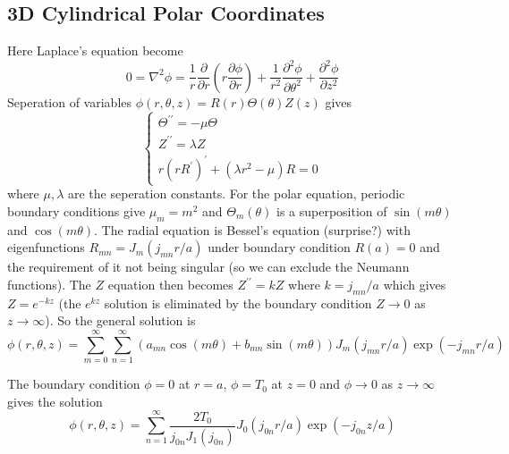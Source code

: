 \subsection{3D Cylindrical Polar Coordinates}
Here Laplace's equation become
$$0=\nabla^2\phi=\frac{1}{r}\frac{\partial}{\partial r}\left( r\frac{\partial\phi}{\partial r} \right)+\frac{1}{r^2}\frac{\partial^2\phi}{\partial\theta^2}+\frac{\partial^2\phi}{\partial z^2}$$
Seperation of variables $\phi(r,\theta,z)=R(r)\Theta(\theta)Z(z)$ gives
$$\begin{cases}
    \Theta^{\prime\prime}=-\mu\Theta\\
    Z^{\prime\prime}=\lambda Z\\
    r(rR^\prime)^\prime+(\lambda r^2-\mu)R=0
\end{cases}$$
where $\mu,\lambda$ are the seperation constants.
For the polar equation, periodic boundary conditions give $\mu_m=m^2$ and $\Theta_m(\theta)$ is a superposition of $\sin(m\theta)$ and $\cos(m\theta)$.
The radial equation is Bessel's equation (surprise?) with eigenfunctions $R_{mn}=J_m(j_{mn}r/a)$ under boundary condition $R(a)=0$ and the requirement of it not being singular (so we can exclude the Neumann functions).
The $Z$ equation then becomes $Z^{\prime\prime}=kZ$ where $k=j_{mn}/a$ which gives $Z=e^{-kz}$ (the $e^{kz}$ solution is eliminated by the boundary condition $Z\to 0$ as $z\to\infty$).
So the general solution is
$$\phi(r,\theta,z)=\sum_{m=0}^\infty\sum_{n=1}^\infty(a_{mn}\cos(m\theta)+b_{mn}\sin(m\theta))J_m(j_{mn}r/a)\exp(-j_{mn}r/a)$$
\begin{example}
    The boundary condition $\phi=0$ at $r=a$, $\phi=T_0$ at $z=0$ and $\phi\to 0$ as $z\to\infty$ gives the solution
    $$\phi(r,\theta,z)=\sum_{n=1}^\infty\frac{2T_0}{j_{0n}J_1(j_{0n})}J_0(j_{0n}r/a)\exp(-j_{0n}z/a)$$
\end{example}
